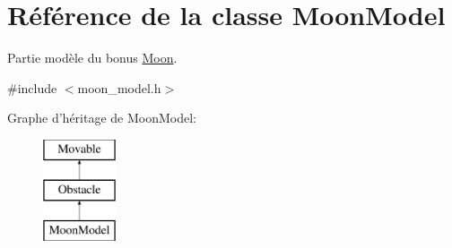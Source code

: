 \hypertarget{class_moon_model}{\section{Référence de la classe Moon\+Model}
\label{class_moon_model}
}


Partie modèle du bonus \hyperlink{class_moon}{Moon}.  




{\ttfamily \#include $<$moon\+\_\+model.\+h$>$}

Graphe d'héritage de Moon\+Model\+:\begin{figure}[H]
\begin{center}
\leavevmode
\includegraphics[height=3.000000cm]{class_moon_model}
\end{center}
\end{figure}
